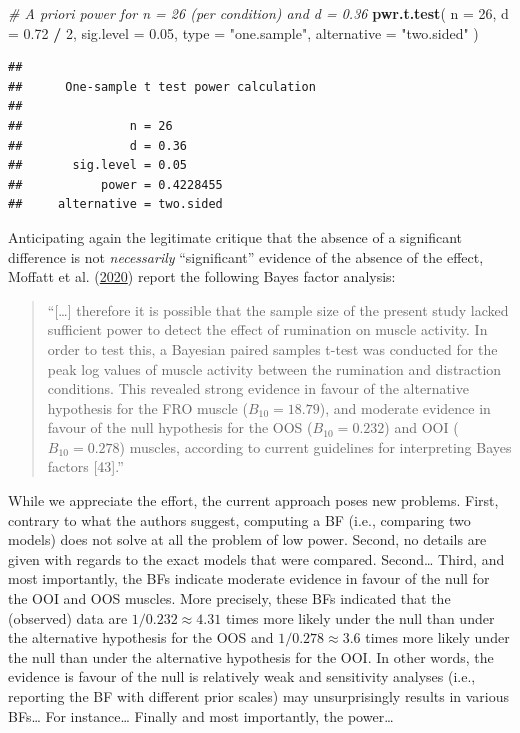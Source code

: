 \documentclass[
  english,
  man,floatsintext]{apa6}
\newenvironment{Shaded}{\begin{snugshade}}{\end{snugshade}}
\newcommand{\CommentTok}[1]{\textcolor[rgb]{0.56,0.35,0.01}{\textit{#1}}}
\newcommand{\DataTypeTok}[1]{\textcolor[rgb]{0.13,0.29,0.53}{#1}}
\newcommand{\DecValTok}[1]{\textcolor[rgb]{0.00,0.00,0.81}{#1}}
\newcommand{\FloatTok}[1]{\textcolor[rgb]{0.00,0.00,0.81}{#1}}
\newcommand{\KeywordTok}[1]{\textcolor[rgb]{0.13,0.29,0.53}{\textbf{#1}}}
\newcommand{\NormalTok}[1]{#1}
\newcommand{\OperatorTok}[1]{\textcolor[rgb]{0.81,0.36,0.00}{\textbf{#1}}}
\newcommand{\StringTok}[1]{\textcolor[rgb]{0.31,0.60,0.02}{#1}}
\begin{document}
\begin{Shaded}
\begin{Highlighting}[]
\CommentTok{\# A priori power for n = 26 (per condition) and d = 0.36}
\KeywordTok{pwr.t.test}\NormalTok{(}
  \DataTypeTok{n =} \DecValTok{26}\NormalTok{, }\DataTypeTok{d =} \FloatTok{0.72} \OperatorTok{/}\StringTok{ }\DecValTok{2}\NormalTok{, }\DataTypeTok{sig.level =} \FloatTok{0.05}\NormalTok{,}
  \DataTypeTok{type =} \StringTok{"one.sample"}\NormalTok{, }\DataTypeTok{alternative =} \StringTok{"two.sided"}
\NormalTok{  )}
\end{Highlighting}
\end{Shaded}

\begin{verbatim}
## 
##      One-sample t test power calculation 
## 
##               n = 26
##               d = 0.36
##       sig.level = 0.05
##           power = 0.4228455
##     alternative = two.sided
\end{verbatim}

Anticipating again the legitimate critique that the absence of a significant difference is not \emph{necessarily} ``significant'' evidence of the absence of the effect, Moffatt et al. (\protect\hyperlink{ref-moffatt_inner_2020}{2020}) report the following Bayes factor analysis:

\begin{quote}
``{[}\ldots{]} therefore it is possible that the sample size of the present study lacked sufficient power to detect the effect of rumination on muscle activity. In order to test this, a Bayesian paired samples t-test was conducted for the peak log values of muscle activity between the rumination and distraction conditions. This revealed strong evidence in favour of the alternative hypothesis for the FRO muscle (\(B_{10} = 18.79\)), and moderate evidence in favour of the null hypothesis for the OOS (\(B_{10} = 0.232\)) and OOI (\(B_{10} = 0.278\)) muscles, according to current guidelines for interpreting Bayes factors {[}43{]}.''
\end{quote}

While we appreciate the effort, the current approach poses new problems. First, contrary to what the authors suggest, computing a BF (i.e., comparing two models) does not solve at all the problem of low power. Second, no details are given with regards to the exact models that were compared. Second\ldots{} Third, and most importantly, the BFs indicate moderate evidence in favour of the null for the OOI and OOS muscles. More precisely, these BFs indicated that the (observed) data are \(1 / 0.232 \approx 4.31\) times more likely under the null than under the alternative hypothesis for the OOS and \(1 / 0.278 \approx 3.6\) times more likely under the null than under the alternative hypothesis for the OOI. In other words, the evidence is favour of the null is relatively weak and sensitivity analyses (i.e., reporting the BF with different prior scales) may unsurprisingly results in various BFs\ldots{} For instance\ldots{} Finally and most importantly, the power\ldots{}
\end{document}
